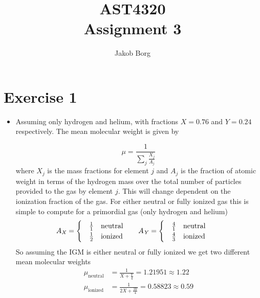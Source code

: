 \documentclass[11pt,a4paper]{article}
\title{AST4320\\ 
\vspace{5mm}Assignment 3}
\author{Jakob Borg}
\begin{document}

\maketitle


\section*{Exercise 1}
\begin{itemize}
\item Assuming only hydrogen and helium, with fractions $\mathit{X}=0.76$ and $\mathit{Y}=0.24$ respectively. The mean molecular weight is given by 

\begin{equation}
\mu = \frac{1}{\sum_j \frac{X_j}{A_j}}
\end{equation}
where $X_j$ is the mass fractions for element $j$ and $A_j$ is the fraction of atomic weight in terms of the hydrogen mass over the total number of particles provided to the gas by element $j$. This will change dependent on the ionization fraction of the gas. For either neutral or fully ionized gas this is simple to compute for a primordial gas (only hydrogen and helium)
\begin{align}
A_\mathit{X} &=
    \begin{cases}
        &\frac{1}{1} \qq{neutral}
        \\
        &\frac{1}{2}\qq{ionized}
    \end{cases}
& 
A_\mathit{Y} &=
    \begin{cases}
    & \frac{4}{1}  \qq{neutral}
    \\
    &\frac{4}{3} \qq{ionized}
    \end{cases}
\end{align}
So assuming the IGM is either neutral or fully ionized we get two different mean molecular weights
\begin{align}
\mu_\text{neutral} &= \frac{1}{\mathit{X}+ \frac{\mathit{Y}}{4}} = 1.21951\approx 1.22
\label{eq:mu_neutral}
\\
\mu_\text{ionized} &= \frac{1}{2\mathit{X}+ \frac{3\mathit{Y}}{4}} = 0.58823 \approx 0.59
\label{eq:mu_ion}
\end{align}


\end{itemize}
\end{document}
